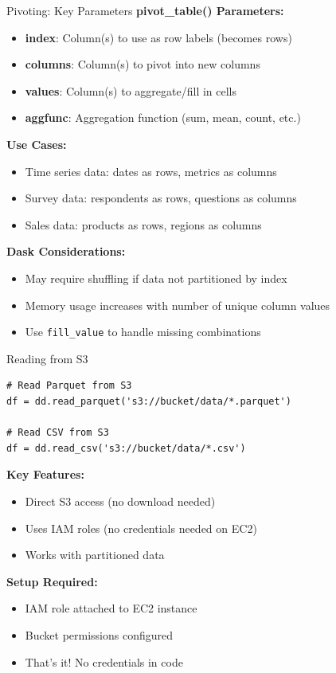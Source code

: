 \documentclass[aspectratio=169]{beamer}
\begin{document}
\begin{frame}[fragile]{Pivoting: Key Parameters}
\small
\textbf{pivot\_table() Parameters:}
\begin{itemize}
    \item \textbf{index}: Column(s) to use as row labels (becomes rows)
    \item \textbf{columns}: Column(s) to pivot into new columns
    \item \textbf{values}: Column(s) to aggregate/fill in cells
    \item \textbf{aggfunc}: Aggregation function (sum, mean, count, etc.)
\end{itemize}

\vspace{0.2cm}
\textbf{Use Cases:}
\begin{itemize}
    \item Time series data: dates as rows, metrics as columns
    \item Survey data: respondents as rows, questions as columns
    \item Sales data: products as rows, regions as columns
\end{itemize}

\vspace{0.2cm}
\textbf{Dask Considerations:}
\begin{itemize}
    \item May require shuffling if data not partitioned by index
    \item Memory usage increases with number of unique column values
    \item Use \texttt{fill\_value} to handle missing combinations
\end{itemize}
\end{frame}

\begin{frame}[fragile]{Reading from S3}
\small
\begin{lstlisting}
# Read Parquet from S3
df = dd.read_parquet('s3://bucket/data/*.parquet')

# Read CSV from S3
df = dd.read_csv('s3://bucket/data/*.csv')
\end{lstlisting}

\textbf{Key Features:}
\begin{itemize}
    \item Direct S3 access (no download needed)
    \item Uses IAM roles (no credentials needed on EC2)
    \item Works with partitioned data
\end{itemize}

\vspace{0.15cm}
\textbf{Setup Required:}
\begin{itemize}
    \item IAM role attached to EC2 instance
    \item Bucket permissions configured
    \item That's it! No credentials in code
\end{itemize}
\end{frame}
\end{document}
